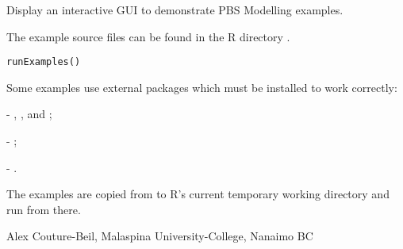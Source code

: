 \documentclass[letterpaper]{book}
\begin{document}
\begin{Description}\relax
Display an interactive GUI to demonstrate PBS Modelling examples.

The example source files can be found in the R directory 
.
\end{Description}
\begin{Usage}
\begin{verbatim}runExamples()\end{verbatim}
\end{Usage}
\begin{Details}\relax
Some examples use external packages which must be installed to work correctly:

 - , , and ;

 - ;

 - .
\end{Details}
\begin{Note}\relax
The examples are copied from  to R's current 
temporary working directory and run from there.
\end{Note}
\begin{Author}\relax
Alex Couture-Beil, Malaspina University-College, Nanaimo BC
\end{Author}
\begin{SeeAlso}\relax
{}
\end{SeeAlso}
\end{document}
